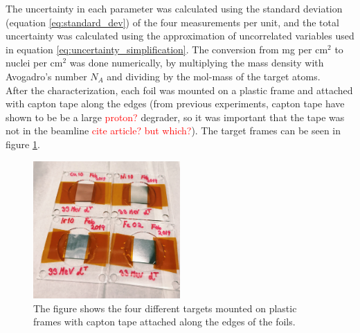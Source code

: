 \documentclass[a4paper,11pt,twoside]{book}
\begin{document}
\noindent 
The uncertainty in each parameter was calculated using the standard deviation (equation \ref{eq:standard_dev}) of the four measurements per unit, and the total uncertainty was calculated using the approximation of uncorrelated variables used in equation \ref{eq:uncertainty_simplification}. The conversion from mg per cm$^2$ to nuclei per cm$^2$ was done numerically, by multiplying the mass density with Avogadro's number $N_A$ and dividing by the mol-mass of the target atoms. \\

\noindent 
After the characterization, each foil was mounted on a plastic frame and attached with capton tape along the edges (from previous experiments, capton tape have shown to be be a large \textcolor{red}{proton?} degrader, so it was important that the tape was not in the beamline \textcolor{red}{cite article? but which?}). The target frames can be seen in figure \ref{fig:targets_on_frame}. 

\begin{figure}
    \centering
    \includegraphics[width=0.5\textwidth]{Experiment/targets_on_frame.JPG}
    \caption{The figure shows the four different targets mounted on plastic frames with capton tape attached along the edges of the foils.}
    \label{fig:targets_on_frame}
\end{figure}
\end{document}
